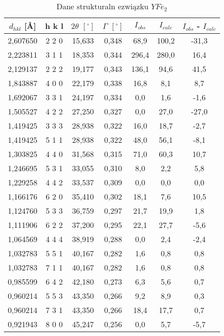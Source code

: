 \documentclass[a4paper,12pt]{article}
\numberwithin{equation}{section}
\begin{document}
\begin{appendices}
  \label{YRentgenTab}
  \scriptsize
  \begin{longtable}[c]{|c|c|c|c|c|c|c|}
\caption{Dane strukturaln ezwiązku $YFe_2$}\\
  \hline
    $d_{hkl}$ [\AA]&	h	k	l&$2\theta$ $\left[ ^{\circ}\right]$&$\Gamma$ $\left[ ^{\circ}\right]$&$I_{obs}$&$I_{calc}$	&$I_{obs}$ - $I_{calc}$	\\\hline\hline
2,607650	&	2   2   0	&	15,633	&	0,348	&	68,9	&	100,2	&	-31,3	\\\hline
2,223811	&	3   1   1	&	18,353	&	0,344	&	296,4	&	280,0	&	16,4	\\\hline
2,129137	&	2   2   2	&	19,177	&	0,343	&	136,1	&	94,6	&	41,5	\\\hline
1,843887	&	4   0   0	&	22,179	&	0,338	&	16,8	&	8,1	&	8,7	\\\hline
1,692067	&	3   3   1	&	24,197	&	0,334	&	0,0	&	1,6	&	-1,6	\\\hline
1,505527	&	4   2   2	&	27,250	&	0,327	&	0,0	&	27,0	&	-27,0	\\\hline
1,419425	&	3   3   3	&	28,938	&	0,322	&	16,0	&	18,7	&	-2,7	\\\hline
1,419425	&	5   1   1	&	28,938	&	0,322	&	48,0	&	56,1	&	-8,1	\\\hline
1,303825	&	4   4   0	&	31,568	&	0,315	&	71,0	&	60,3	&	10,7	\\\hline
1,246695	&	5   3   1	&	33,055	&	0,310	&	8,0	&	2,2	&	5,8	\\\hline
1,229258	&	4   4   2	&	33,537	&	0,309	&	0,0	&	0,0	&	0,0	\\\hline
1,166176	&	6   2   0	&	35,410	&	0,302	&	18,1	&	7,6	&	10,5	\\\hline
1,124760	&	5   3   3	&	36,759	&	0,297	&	21,7	&	19,9	&	1,8	\\\hline
1,111906	&	6   2   2	&	37,200	&	0,295	&	22,1	&	27,7	&	-5,6	\\\hline
1,064569	&	4   4   4	&	38,919	&	0,288	&	0,0	&	2,4	&	-2,4	\\\hline
1,032783	&	5   5   1	&	40,167	&	0,282	&	1,6	&	0,8	&	0,8	\\\hline
1,032783	&	7   1   1	&	40,167	&	0,282	&	1,6	&	0,8	&	0,8	\\\hline
0,985599	&	6   4   2	&	42,180	&	0,273	&	6,3	&	5,6	&	0,7	\\\hline
0,960214	&	5   5   3	&	43,350	&	0,266	&	9,2	&	8,9	&	0,3	\\\hline
0,960214	&	7   3   1	&	43,350	&	0,266	&	18,4	&	17,7	&	0,7	\\\hline
0,921943	&	8   0   0	&	45,247	&	0,256	&	0,0	&	5,7	&	-5,7	\\\hline

\end{longtable}
\end{appendices}
\end{document}

